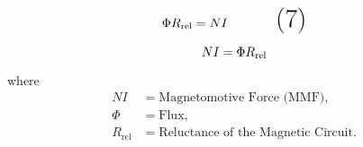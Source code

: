 \documentclass{article}
\begin{document}
\vspace{0.5cm} %
\begin{equation}
   \huge  {\Phi}R_\text{rel}= NI \tag{7}
\end{equation}\vspace{0.5cm} %

\begin{tcolorbox}[colframe=red, boxrule=1mm, sharp corners=south] %
\[
   \Huge NI= {\Phi}R_\text{rel}
\]
\end{tcolorbox}

\noindent
where 
\begin{align*}
NI &= \text{Magnetomotive Force (MMF)}, \\
\Phi &= \text{Flux}, \\
R_\text{rel} &= \text{Reluctance of the Magnetic Circuit}.
\end{align*}
\end{document}
